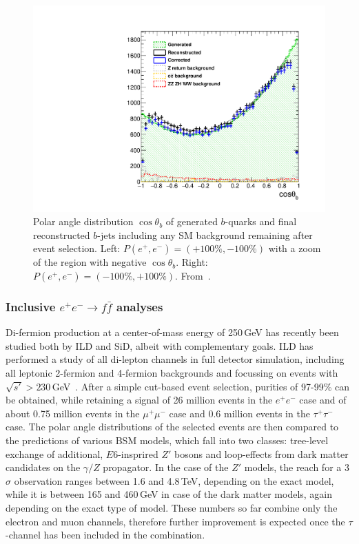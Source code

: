 \begin{figure}[hbt]
        \hspace{0.2cm}       
        \includegraphics[width=0.45\linewidth]{./chapters/figures/basymmetry-final-right.pdf}
	\caption{Polar angle distribution $\cos{\theta_b}$ of generated $b$-quarks and final reconstructed 
         $b$-jets including any SM  background remaining after event selection. 
         Left:  $P(e^+,e^-)=(+100\%,-100\%)$ with a zoom of the region with negative 
         $\cos{\theta_b}$.
         Right: $P(e^+,e^-)=(-100\%,+100\%)$. From~\cite{Bilokin:2017lco}.  }
	\label{fig:ffbar_basym}
\end{figure}


\subsubsection{Inclusive $e^+e^- \to f\bar{f}$ analyses}
Di-fermion production at a center-of-mass energy of 250\,GeV has recently been studied both by ILD and SiD, albeit with complementary goals. ILD has performed a study of all di-lepton channels in full detector simulation, including all leptonic 2-fermion and 4-fermion backgrounds and focussing on events with $\sqrt{s'}>230$\,GeV~\cite{bib:deguchi_lcws18, Yamashiro:2018ant}. After a simple cut-based event selection, purities of 97-99\% can be obtained, while retaining a signal of 26 million events in the $e^+e^-$ case and of about 0.75 million events in the $\mu^+\mu^-$ case and 0.6 million events in the $\tau^+\tau^-$ case. The polar angle distributions of the selected events are then compared to the predictions of various BSM models, which fall into two classes: tree-level exchange of additional, $E6$-insprired $Z'$ bosons and loop-effects from dark matter candidates on the $\gamma/Z$ propagator. In the case of the $Z'$ models, the reach for a 3$\sigma$ observation ranges between 1.6 and 4.8\,TeV, depending on the exact model, while it is between 165 and 460\,GeV in case of the dark matter models, again depending on the exact type of model. These numbers so far combine only the electron and muon channels, therefore further improvement is expected once the $\tau$-channel has been included in the combination.

